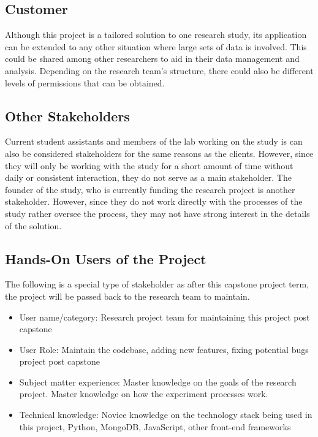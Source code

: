\documentclass[12pt]{article}
\begin{document}
\subsection{Customer}
Although this project is a tailored solution to one research study, its
application can be extended to any other situation where large sets of data is
involved. This could be shared among other researchers to aid in their data
management and analysis. Depending on the research team's structure, there could
also be different levels of permissions that can be obtained.
\subsection{Other Stakeholders}
Current student assistants and members of the lab working on the study is can also be
considered stakeholders for the same reasons as the clients. However, since they
will only be working with the study for a short amount of time without daily or
consistent interaction, they do not serve as a main stakeholder. The founder of
the study, who is currently funding the research project is another stakeholder.
However, since they do not work directly with the processes of the study rather
oversee the process, they may not have strong interest in the details of the solution. 
\subsection{Hands-On Users of the Project}
\label{sec:2.4}
The following is a special type of stakeholder as after this capstone project
term, the project will be passed back to the research team to maintain. 
\begin{itemize}
  \item User name/category: Research project team for maintaining this project post capstone 
  \item User Role: Maintain the codebase, adding new features, fixing potential bugs
  project post capstone
  \item Subject matter experience: Master knowledge on the goals of the research
  project. Master knowledge on how the experiment processes work. 
  \item Technical knowledge: Novice knowledge on the technology stack being
  used in this project, Python, MongoDB, JavaScript, other front-end frameworks 
\end{itemize}
\end{document}
